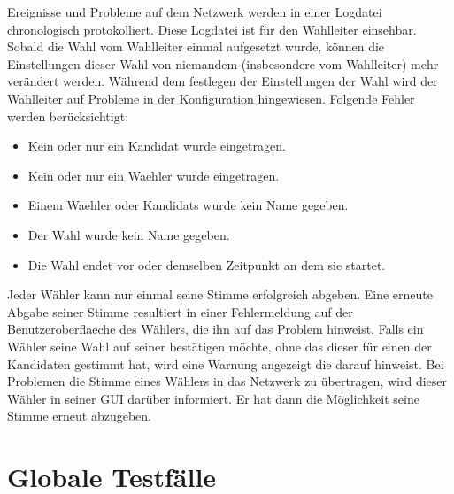 \documentclass[parskip=full,11pt,twoside]{scrartcl}
\begin{document}
Ereignisse und Probleme auf dem \gls{Netzwerk} werden in einer \gls{Logdatei} chronologisch protokolliert. Diese \gls{Logdatei} ist für den \gls{Wahlleiter} einsehbar.
Sobald die Wahl vom \gls{Wahlleiter} einmal aufgesetzt wurde, können die Einstellungen dieser Wahl von niemandem (insbesondere vom \gls{Wahlleiter}) mehr verändert werden.
Während dem festlegen der Einstellungen der Wahl wird der \gls{Wahlleiter} auf Probleme in der \gls{Konfiguration} hingewiesen. Folgende Fehler werden berücksichtigt:
	\begin{itemize}
		\item Kein oder nur ein \gls{Kandidat} wurde eingetragen.
		\item Kein oder nur ein \gls{Waehler} wurde eingetragen.
		\item Einem \gls{Waehler} oder \glspl{Kandidat} wurde kein Name gegeben.
		\item Der \gls{Wahl} wurde kein Name gegeben.
		\item Die \gls{Wahl} endet vor oder demselben Zeitpunkt an dem sie startet.
	\end{itemize}
Jeder Wähler kann nur einmal seine Stimme erfolgreich abgeben. Eine erneute Abgabe seiner Stimme resultiert in einer Fehlermeldung auf der \gls{Benutzeroberflaeche} des Wählers, die ihn auf das Problem hinweist.
Falls ein Wähler seine Wahl auf seiner  bestätigen möchte, ohne das dieser für einen der Kandidaten gestimmt hat, wird eine Warnung angezeigt die darauf hinweist.
Bei Problemen die Stimme eines Wählers in das \gls{Netzwerk} zu übertragen, wird dieser Wähler in seiner GUI darüber informiert. Er hat dann die Möglichkeit seine Stimme erneut abzugeben. 

\section{Globale Testfälle}
\end{document}
